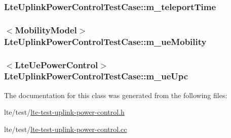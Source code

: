 \subsubsection[{\texorpdfstring{m\+\_\+teleport\+Time}{m_teleportTime}}]{ Lte\+Uplink\+Power\+Control\+Test\+Case\+::m\+\_\+teleport\+Time\hspace{0.3cm}{\ttfamily [protected]}}\hypertarget{classLteUplinkPowerControlTestCase_ad2fcd44e6878fcefd595cce85c241129}{}\label{classLteUplinkPowerControlTestCase_ad2fcd44e6878fcefd595cce85c241129}
\subsubsection[{\texorpdfstring{m\+\_\+ue\+Mobility}{m_ueMobility}}]{$<${\bf Mobility\+Model}$>$ Lte\+Uplink\+Power\+Control\+Test\+Case\+::m\+\_\+ue\+Mobility\hspace{0.3cm}{\ttfamily [protected]}}\hypertarget{classLteUplinkPowerControlTestCase_a0b8bf35679af00783442c2e310b30e45}{}\label{classLteUplinkPowerControlTestCase_a0b8bf35679af00783442c2e310b30e45}
\subsubsection[{\texorpdfstring{m\+\_\+ue\+Upc}{m_ueUpc}}]{$<${\bf Lte\+Ue\+Power\+Control}$>$ Lte\+Uplink\+Power\+Control\+Test\+Case\+::m\+\_\+ue\+Upc\hspace{0.3cm}{\ttfamily [protected]}}\hypertarget{classLteUplinkPowerControlTestCase_af2fabece7259e4b60cc73d7ec02b7a3d}{}\label{classLteUplinkPowerControlTestCase_af2fabece7259e4b60cc73d7ec02b7a3d}


The documentation for this class was generated from the following files\+:\begin{DoxyCompactItemize}
\item 
lte/test/\hyperlink{lte-test-uplink-power-control_8h}{lte-\/test-\/uplink-\/power-\/control.\+h}\item 
lte/test/\hyperlink{lte-test-uplink-power-control_8cc}{lte-\/test-\/uplink-\/power-\/control.\+cc}\end{DoxyCompactItemize}
